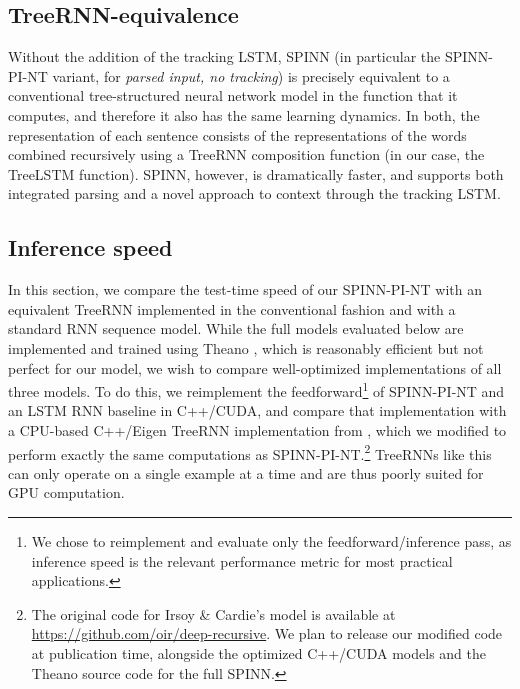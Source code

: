 \documentclass[11pt]{article}
\begin{document}
\subsection{TreeRNN-equivalence}

Without the addition of the tracking LSTM, SPINN (in particular the SPINN-PI-NT variant, for \textit{parsed input, no tracking}) is precisely equivalent to a conventional tree-structured neural network model in the function that it computes, and therefore it also has the same learning dynamics. In both, the representation of each sentence consists of the representations of the words combined recursively using a TreeRNN composition function (in our case, the TreeLSTM function). SPINN, however, is dramatically faster, and supports both integrated parsing and a novel approach to context through the tracking LSTM.

\subsection{Inference speed}
\label{sec:speed}

In this section, we compare the test-time speed of our SPINN-PI-NT with an equivalent TreeRNN implemented in the conventional fashion and with a standard RNN sequence model. While the full models evaluated below are implemented and trained using Theano \citep{bergstra+al:2010-scipy,Bastien-Theano-2012}, which is reasonably efficient but not perfect for our model, we wish to compare well-optimized implementations of all three models. To do this, we reimplement the feedforward\footnote{We chose to reimplement and evaluate only the feedforward/inference pass, as inference speed is the relevant performance metric for most practical applications.} of SPINN-PI-NT and an LSTM RNN baseline in C++/CUDA, and compare that implementation with a CPU-based C++/Eigen TreeRNN implementation from \citet{irsoy2014deep}, which we modified to perform exactly the same computations as SPINN-PI-NT.\footnote{The original code for Irsoy \& Cardie's model is available at \url{https://github.com/oir/deep-recursive}. We plan to release our modified code at publication time, alongside the optimized C++/CUDA models and the Theano source code for the full SPINN.} TreeRNNs like this can only operate on a single example at a time and are thus poorly suited for GPU computation.
\end{document}
